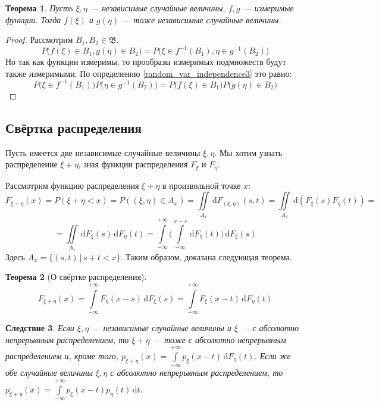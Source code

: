 \documentclass[11pt,openany,a4paper]{scrartcl}
\theoremstyle{plain}
\newtheorem{theorem}{Теорема}[subsection]
\newtheorem{corollary}[theorem]{Следствие}
\theoremstyle{definition}
\newcommand{\dif}{\, \mathrm d}
\begin{document}
\begin{theorem}\label{functions_of_independent_variables}
    Пусть $\xi, \eta$ — независимые случайные величины, $f, g$ — измеримые 
    функции. Тогда $f(\xi)$ и $g(\eta)$ — тоже независимые случайные величины.
\end{theorem}
\begin{proof}
    Рассмотрим $B_1, B_2 \in \mathfrak B$.
    $$
    P\big(f(\xi) \in B_1, g(\eta) \in B_2\big) =
    P\big(\xi \in f^{-1}(B_1), \eta \in g^{-1}(B_2)\big)
    $$
    Но так как функции измеримы, то прообразы измеримых подмножеств будут также 
    измеримыми. По определению \ref{random_var_independence3} это равно:
    $$
    P\big(\xi \in f^{-1}(B_1)\big) P\big(\eta \in g^{-1}(B_2)\big) = P\big(f(\xi) \in B_1\big)
    P\big(g(\eta) \in B_2\big)
    $$
\end{proof}

\subsection{Свёртка распределения}

Пусть имеется две независимые случайные величины $\xi, \eta$. Мы хотим узнать
распределение $\xi + \eta$, зная функции распределения $F_\xi$ и $F_\eta$.

Рассмотрим функцию распределения $\xi + \eta$ в произвольной точке $x$:
$$
F_{\xi + \eta}(x) = P(\xi + \eta < x) = P((\xi, \eta) \in A_x) = 
\iint\limits_{A_x} \dif F_{(\xi, \eta)}(s, t) =
\iint\limits_{A_x} \dif(F_\xi(s)F_\eta(t)) =
$$
$$
= \iint\limits_{A_x} \dif F_\xi(s)\dif F_\eta(t) =
\int\limits_{-\infty}^{+\infty}
\Bigg(\int\limits_{-\infty}^{x-s} \dif F_\eta(t)\Bigg) \dif F_\xi(s)
$$
Здесь $A_x = \{(s, t)\, |\, s+t<x\}$. Таким образом, доказана следующая теорема.
\begin{theorem}[О свёртке распределения]
    $$
    F_{\xi + \eta}(x) = \int\limits_{-\infty}^{+\infty} F_\eta(x-s)
    \dif F_\xi(s) =
    \int\limits_{-\infty}^{+\infty} F_\xi(x-t) \dif F_\eta(t)
    $$
\end{theorem}
\begin{corollary}
    Если $\xi, \eta$ — независимые случайные величины и $\xi$ — с абсолютно
    непрерывным распределением, то $\xi + \eta$ — тоже с абсолютно непрерывным
    распределением и, кроме того, $p_{\xi + \eta}(x) =
    \int\limits_{-\infty}^{+\infty} p_\xi(x - t) \dif F_\eta(t)$. Если же
    обе случайные величины $\xi, \eta$ с абсолютно непрерывным распределением,
    то $p_{\xi + \eta}(x) = \int\limits_{-\infty}^{+\infty}
    p_\xi(x-t)p_\eta(t)\dif t$.
\end{corollary}
\end{document}
